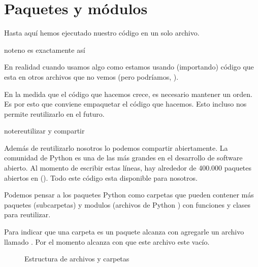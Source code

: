\documentclass[a4paper,12pt,spanish]{sphinxmanual}
\begin{document}
\sphinxstepscope


\chapter{Paquetes y módulos}
\label{\detokenize{my-modules:paquetes-y-modulos}}\label{\detokenize{my-modules::doc}}
\sphinxAtStartPar
Hasta aquí hemos ejecutado nuestro código en un solo archivo.

\begin{sphinxadmonition}{note}{no es exactamente así}

\sphinxAtStartPar
En realidad cuando usamos algo como 
estamos usando (importando) código que esta en otros archivos que no vemos (pero
podríamos, ).
\end{sphinxadmonition}

\sphinxAtStartPar
En la medida que el código que hacemos crece, es necesario mantener un orden.
Es por esto que conviene empaquetar el código que hacemos. Esto incluso nos permite
reutilizarlo en el futuro.

\begin{sphinxadmonition}{note}{reutilizar y compartir}

\sphinxAtStartPar
Además de reutilizarlo nosotros lo podemos compartir
abiertamente. La comunidad de Python es una de las más grandes en el desarrollo de
software abierto. Al momento de escribir estas líneas, hay alrededor de 400.000 paquetes
abiertos en  (). Todo este código
esta disponible para nosotros.
\end{sphinxadmonition}

\sphinxAtStartPar
Podemos pensar a los paquetes Python como carpetas que pueden contener más paquetes
(sub\sphinxhyphen{}carpetas) y modulos (archivos de Python ) con funciones y clases para reutilizar.

\sphinxAtStartPar
Para indicar que una carpeta es un paquete alcanza con agregarle un archivo llamado
. Por el momento alcanza con que este archivo este vacío.

\begin{figure}[htbp]
\centering
\capstart

\caption{Estructura de archivos y carpetas}\label{\detokenize{my-modules:pkg-structure}}\end{figure}
\end{document}
